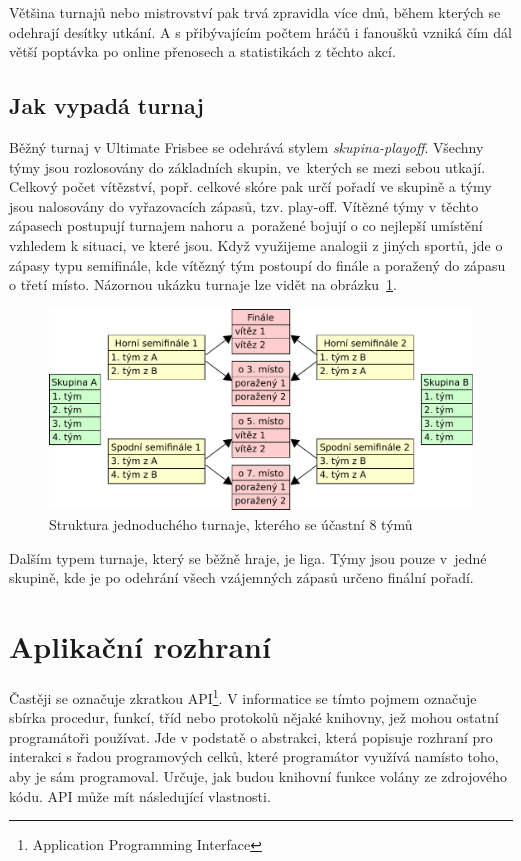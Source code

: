 Většina turnajů nebo mistrovství pak trvá zpravidla více dnů, během kterých se odehrají desítky
utkání. A s přibývajícím počtem hráčů i fanoušků vzniká čím dál větší poptávka po online
přenosech a statistikách z těchto akcí.

\subsection{Jak vypadá turnaj}

Běžný turnaj v Ultimate Frisbee se odehrává stylem \textit{skupina-playoff}. Všechny týmy jsou rozlosovány do základních skupin,
ve~kterých se mezi sebou utkají. Celkový počet vítězství, popř. celkové skóre pak určí pořadí ve skupině a týmy
jsou nalosovány do vyřazovacích zápasů, tzv. play-off. Vítězné týmy v těchto zápasech postupují turnajem nahoru
a~poražené bojují o co nejlepší umístění vzhledem k situaci, ve které jsou. Když využijeme analogii z jiných sportů, jde o zápasy typu semifinále,
kde vítězný tým postoupí do finále a poražený do zápasu o třetí místo. Názornou ukázku turnaje lze vidět na obrázku~\ref{fig:tournament}.

\begin{figure}[ht!]
  \centering
  \includegraphics[width=130mm]{./images/turnaj.pdf}
  \caption{Struktura jednoduchého turnaje, kterého se účastní 8 týmů\label{overflow}}
  \label{fig:tournament}
\end{figure}

Dalším typem turnaje, který se běžně hraje, je liga. Týmy jsou pouze v~jedné skupině,
kde je po odehrání všech vzájemných zápasů určeno finální pořadí.

\section{Aplikační rozhraní}

Častěji se označuje zkratkou API\footnote{Application Programming Interface}.
V informatice se tímto pojmem označuje sbírka procedur, funkcí, tříd
nebo protokolů nějaké knihovny, jež mohou ostatní programátoři používat.
Jde v podstatě o abstrakci, která popisuje rozhraní pro interakci s řadou programových celků,
které programátor využívá namísto toho, aby je sám programoval.
Určuje, jak budou knihovní funkce volány ze zdrojového kódu. API může mít následující vlastnosti.

